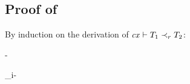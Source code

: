 \subsection*{Proof of }

By induction on the derivation of $\mathit{cx}\vdash T_1\prec_{r}T_2$:

\begin{bycase}

\Case{\Rstsub}
\begin{derivation}
\step{\istyO{\tsubO}}{\premof{\Rstsub}}
\end{derivation}

\Case{\Rstrefl}

\Case{\Rstarr}
\begin{derivation}
\step{\efvar{\tspred}=\emptyset}{\indhyp}
\steP
{
 \efvar{\tspred}-
 \emptyset}
\end{derivation}

\Case{\Rstrec}
\begin{derivation}
\steP
{
 \bigcup_i-\setI{\var}
 \emptyset}
\end{derivation}


\Case{\Rstteq}
\StepO{\efvar{\tspred}=\emptyset}{\indhyp}

\end{bycase}



